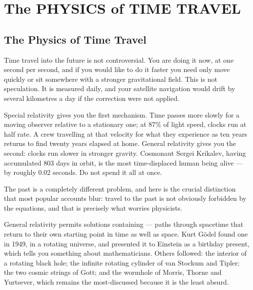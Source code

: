 \chapter{The PHYSICS of TIME TRAVEL}\label{ch:time}


\section{The Physics of Time Travel}\label{sec:physicstimetravel}

Time travel into the future is not controversial. You are doing it now, at one second per
second, and if you would like to do it faster you need only move quickly or sit somewhere
with a stronger gravitational field. This is not speculation. It is measured daily, and
your satellite navigation would drift by several kilometres a day if the correction were
not applied.

Special relativity gives you the first mechanism. Time passes more slowly for a moving
observer relative to a stationary one; at 87\% of light speed, clocks run at half rate. A
crew travelling at that velocity for what they experience as ten years returns to find
twenty years elapsed at home.  General relativity gives you the second: clocks run slower
in stronger gravity. Cosmonaut Sergei Krikalev, having accumulated 803 days in orbit, is
the most time-displaced human being alive --- by roughly 0.02 seconds. Do not spend it all
at once.

The past is a completely different problem, and here is the crucial distinction that most
popular accounts blur: travel to the past is not obviously forbidden by the equations, and
that is precisely what worries physicists.

General relativity permits solutions containing  --- paths
through spacetime that return to their own starting point in time as well as space. Kurt
G\"odel found one in 1949, in a rotating universe, and presented it to Einstein as a
birthday present, which tells you something about mathematicians. Others followed: the
interior of a rotating black hole; the infinite rotating cylinder of van Stockum and
Tipler; the two cosmic strings of Gott; and the wormhole of Morris, Thorne and Yurtsever,
which remains the most-discussed because it is the least absurd.

